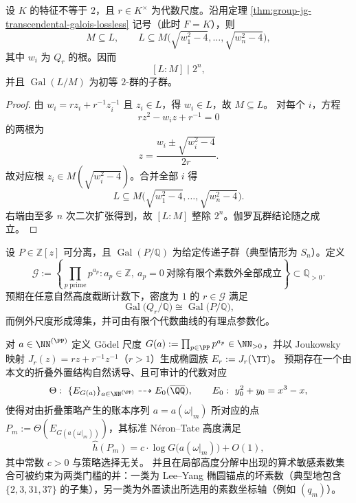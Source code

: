 \begin{proposition}[代数尺度下的二元纤维上界]\label{prop:group-jg-algebraic-scale-fiber-2power}
设 \(K\) 的特征不等于 \(2\)，且 \(r\in K^\times\) 为代数尺度。沿用定理 \ref{thm:group-jg-transcendental-galois-lossless} 记号（此时 \(F=K\)），则
\[
M\subseteq L,\qquad
L\subseteq M\bigl(\sqrt{w_1^2-4},\dots,\sqrt{w_n^2-4}\bigr),
\]
其中 \(w_i\) 为 \(Q_r\) 的根。因而
\[
[L:M]\mid 2^n,
\]
并且 \(\operatorname{Gal}(L/M)\) 为初等 \(2\)-群的子群。
\end{proposition}
\begin{proof}
由 \(w_i=r z_i+r^{-1}z_i^{-1}\) 且 \(z_i\in L\)，得 \(w_i\in L\)，故 \(M\subseteq L\)。
对每个 \(i\)，方程
\[
r z^2-w_i z+r^{-1}=0
\]
的两根为
\[
z=\frac{w_i\pm \sqrt{w_i^2-4}}{2r}.
\]
故对应根 \(z_i\in M(\sqrt{w_i^2-4})\)。合并全部 \(i\) 得
\[
L\subseteq M\bigl(\sqrt{w_1^2-4},\dots,\sqrt{w_n^2-4}\bigr).
\]
右端由至多 \(n\) 次二次扩张得到，故 \([L:M]\) 整除 \(2^n\)。伽罗瓦群结论随之成立。
\end{proof}



\begin{conjecture}\label{conj:group-jg-hilbert-coherence-godel-scales}
设 \(P\in \mathbb{Z}[z]\) 可分离，且 \(\operatorname{Gal}(P/\mathbb{Q})\) 为给定传递子群（典型情形为 \(S_n\)）。定义
\[
\mathcal{G}:=
\left\{
\prod_{p\ \mathrm{prime}}p^{a_p}:
a_p\in\mathbb{Z},\ a_p=0\ \text{对除有限个素数外全部成立}
\right\}
\subset \mathbb{Q}_{>0}.
\]
预期在任意自然高度截断计数下，密度为 \(1\) 的 \(r\in\mathcal{G}\) 满足
\[
\operatorname{Gal}\bigl(Q_r/\mathbb{Q}\bigr)\cong \operatorname{Gal}\bigl(P/\mathbb{Q}\bigr),
\]
而例外尺度形成薄集，并可由有限个代数曲线的有理点参数化。
\end{conjecture}

\begin{conjecture}\label{conj:group-jg-ledger-nt-height-principle}
对 \(a\in\NN^{(\PP)}\) 定义 Gödel 尺度
\(
G(a):=\prod_{p\in\PP}p^{a_p}\in\NN_{>0}
\)，并以 Joukowsky 映射 \(J_r(z)=r z+r^{-1}z^{-1}\)（\(r>1\)）生成椭圆族 \(E_r:=J_r(\TT)\)。
预期存在一个由本文的折叠外置结构自然诱导、且可审计的代数对应
\[
\Theta:\ \{E_{G(a)}\}_{a\in\NN^{(\PP)}}\dashrightarrow E_0(\overline{\QQ}),
\qquad
E_0:\ y_0^2+y_0=x^3-x,
\]
使得对由折叠策略产生的账本序列 \(a=a(\omega|_m)\) 所对应的点 \(P_m:=\Theta(E_{G(a(\omega|_m))})\)，其标准 N\'eron--Tate 高度满足
\[
\widehat h(P_m)=c\cdot \log G\bigl(a(\omega|_m)\bigr)+O(1),
\]
其中常数 \(c>0\) 与策略选择无关。
并且在局部高度分解中出现的算术敏感素数集合可被约束为两类门槛的并：一类为 Lee--Yang 椭圆锚点的坏素数（典型地包含 \(\{2,3,31,37\}\) 的子集），另一类为外置读出所选用的素数坐标轴（例如 \((q_m)\)）。
\end{conjecture}

